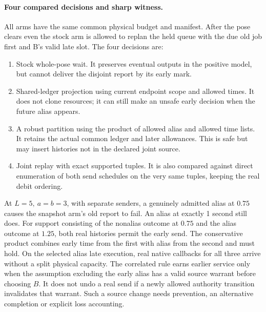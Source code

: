\documentclass{article}
\begin{document}
\paragraph{Four compared decisions and sharp witness.}
All arms have the same common physical budget and manifest.
After the pose clears even the stock arm is allowed to replan
the held queue with the due old job first and B's valid late
slot. The four decisions are:
\begin{enumerate}
\item Stock whole-pose wait. It preserves eventual outputs in
the positive model, but cannot deliver the disjoint report by its
early mark.
\item Shared-ledger projection using current endpoint scope and
allowed times. It does not clone resources; it can still make
an unsafe early decision when the future alias appears.
\item A robust partition using the product of allowed alias and
allowed time lists. It retains the actual common ledger and
later allowances. This is safe but may insert histories not in
the declared joint source.
\item Joint replay with exact supported tuples. It is also
compared against direct enumeration of both send schedules on
the very same tuples, keeping the real debit ordering.
\end{enumerate}
At \(L=5,\ a=b=3\), with separate senders, a genuinely admitted
alias at \(0.75\) causes the snapshot arm's old report to fail.
An alias at exactly 1 second still does. For support consisting
of the nonalias outcome at \(0.75\) and the alias outcome
at \(1.25\), both real histories permit the early send.
The conservative product combines early time from the first
with alias from the second and must hold. On the selected alias
late execution, real native callbacks for all three arrive
without a split physical capacity. The correlated rule earns
earlier service only when the assumption excluding the early
alias has a valid source warrant before choosing \(B\). It does
not undo a real send if a newly allowed authority transition
invalidates that warrant. Such a source change needs prevention,
an alternative completion or explicit loss accounting.
\end{document}
